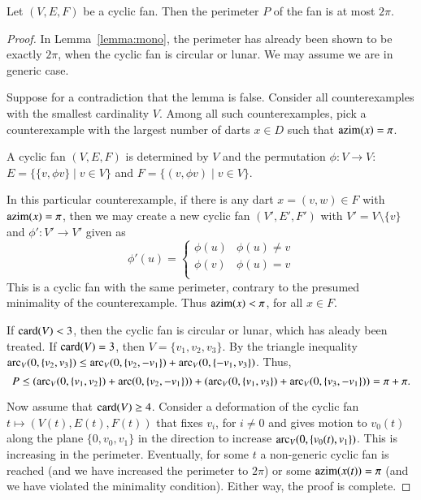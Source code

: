{{%





\begin{lemma}
Let $(V,E,F)$ be a cyclic fan.  Then the perimeter $P$ of the fan is at most $2\pi$.
\end{lemma}

\begin{proof} In Lemma~\ref{lemma:mono}, the perimeter has already been shown to be exactly $2\pi$, when the cyclic fan is circular or lunar.  We may assume we are in generic case.

Suppose for a contradiction that the lemma is false.  Consider all counterexamples with the smallest cardinality $V$.  Among all such counterexamples, pick a counterexample with the largest number of darts $x\in D$ such that ${\operatorname{azim}}(x) = \pi$.

A cyclic fan $(V,E,F)$ is determined by $V$ and the permutation $\phi:V\to V$:  $E=\{\{v,\phi v\}\mid v\in V\}$ and $F = \{(v,\phi v)\mid v\in V\}$.

In this particular counterexample, if there is any dart $x=(v,w)\in F$ with ${\operatorname{azim}}(x)=\pi$, then we may create a new cyclic fan $(V',E',F')$ with $V' = V\setminus\{v\}$ and $\phi':V'\to V'$ given as 
$$
\phi'(u) = \begin{cases}
\phi(u) & \phi(u)\ne v\\
\phi(v) & \phi(u) = v\\
\end{cases}
$$
This is a cyclic fan with the same perimeter, contrary to the presumed minimality of the counterexample.  Thus ${\operatorname{azim}}(x) <\pi$, for all $x\in F$.

If ${\operatorname{card}}(V) <3$, then the cyclic fan is circular or lunar, which has aleady been treated.  If ${\operatorname{card}}(V)=3$, then $V=\{v_1,v_2,v_3\}$.  By the triangle inequality $\operatorname{arc}_V(0,\{v_2,v_3\}) \le \operatorname{arc}_V(0,\{v_2,-v_1\})+\operatorname{arc}_V(0,\{-v_1,v_3\})$.  Thus,
$$
P \le(\operatorname{arc}_V(0,\{v_1,v_2\})+\operatorname{arc}(0,\{v_2,-v_1\}))+(\operatorname{arc}_V(0,\{v_1,v_3\})+\operatorname{arc}_V(0,\{v_3,-v_1\})) = \pi+\pi.
$$

Now assume that ${\operatorname{card}}(V)\ge 4$.  Consider a deformation of the cyclic fan $t\mapsto (V(t),E(t),F(t))$ that fixes $v_i$, for $i\ne 0$ and gives motion to $v_0(t)$ along the plane $\{0,v_0,v_1\}$ in the direction to increase $\operatorname{arc}_V(0,\{v_0(t),v_1\})$.  This is increasing in the perimeter.  Eventually, for some $t$ a non-generic cyclic fan is reached (and we have increased the perimeter to $2\pi$) or some ${\operatorname{azim}}(x(t))=\pi$ (and we have violated the minimality condition).  Either way, the proof is complete. 
\end{proof}

}}
